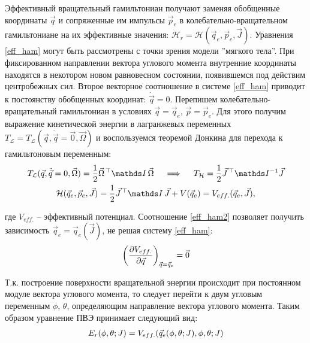 Эффективный вращательный гамильтониан получают заменяя обобщенные координаты $\vec{q}$ и сопряженные им импульсы $\vec{p}_e$ в колебательно-вращательном гамильтониане на их эффективные значения: $\mathcal{H}_r = \mathcal{H} (\vec{q}_e, \vec{p}_e, \vec{J})$.
Уравнения \eqref{eff_ham} могут быть рассмотрены с точки зрения модели ''мягкого тела''. При фиксированном направлении вектора углового момента внутренние координаты находятся в некотором новом равновесном состоянии, появившемся под действим центробежных сил. 
Второе векторное соотношение в системе \eqref{eff_ham} приводит к постоянству обобщенных координат: $\dot{\vec{q}} = 0$. Перепишем колебательно-вращательный гамильтониан в условиях $\vec{q} = \vec{q}_e$, $\vec{p} = \vec{p}_e$. Для этого получим выражение кинетической энергии в лагранжевых переменных $T_\mathcal{L} = T_\mathcal{L} (\vec{q}, \dot{\vec{q}} = \vec{0}, \vec{\Omega})$ и воспользуемся теоремой Донкина для перехода к гамильтоновым переменным:
\vverh
\begin{gather}
T_\mathcal{L}(\vec{q}, \dot{\vec{q}} = 0, \vec{\Omega}) = \frac{1}{2} \vec{\Omega}^{\, \top} \bbI \, \vec{\Omega} \quad \implies \quad T_\mathcal{H} = \frac{1}{2} \vec{J}^{\, \top} \bbI^{-1} \vec{J} \notag \\
\mathcal{H}(\vec{q}_e, \vec{p}_e, \vec{J}) = \frac{1}{2} \vec{J}^{\, \top} \bbI \, \vec{J} + V(\vec{q}_e) = V_{eff.} (\vec{q}_e, \vec{J}), \label{eff_ham2}
\end{gather}

\vlevo где $V_{eff.}$ -- эффективный потенциал. Соотношение \eqref{eff_ham2} позволяет получить зависимость $\vec{q}_e = \vec{q}_e (\vec{J})$, не решая систему \eqref{eff_ham}:
\begin{gather}
\left( \frac{\partial V_{eff.}}{\partial \vec{q}} \right)_{\vec{q} = \vec{q}_e} = \vec{0} \notag
\end{gather}

Т.к. построение поверхности вращательной энергии происходит при постоянном модуле вектора углового момента, то следует перейти к двум угловым переменным $\phi$, $\theta$, определяющим направление вектора углового момента. Таким образом уравнение ПВЭ принимает следующий вид: 
\vverh
\begin{gather}
E_r (\phi, \theta; J) = V_{eff.} (\vec{q}_e (\phi, \theta; J), \phi, \theta; J) \notag
\end{gather}

